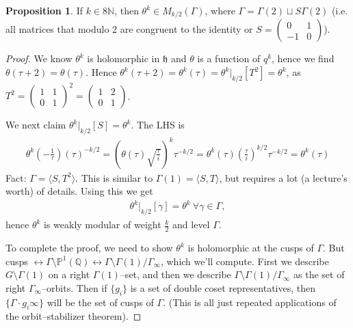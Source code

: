 \documentclass{article}
\theoremstyle{definition}
\newtheorem{prop}[theorem]{Proposition}
\begin{document}
\begin{prop}
    If $k \in 8 \mathbb{N}$, then $\theta^k \in M_{k/2}(\Gamma)$, where $\Gamma = \Gamma(2) \sqcup S \Gamma(2)$ (i.e. all matrices that modulo 2 are congruent to the identity or $S = \begin{pmatrix} 0&1\\-1&0 \end{pmatrix}$).
\end{prop}
\begin{proof}
    We know $\theta^k$ is holomorphic in $\mathfrak{h}$ and $\theta$ is a function of $q^k$, hence we find $\theta(\tau+2) = \theta(\tau)$. Hence $\theta^k(\tau+2) = \theta^k(\tau) = \theta^k|_{k/2}[T^2]=\theta^k$, as $T^2 = \begin{pmatrix} 1 & 1\\0 &1 \end{pmatrix}^2 = \begin{pmatrix} 1 & 2\\0 & 1 \end{pmatrix}$.
    \vspace{1mm}
     
    We next claim $\theta^k|_{k/2}[S] = \theta^k$. The LHS is 
    \begin{align*}
        \theta^k \left(-\frac{1}{\tau}\right)(\tau)^{-k/2} = \left(\theta(\tau) \sqrt{\frac{\tau}{i}}\right)^k \tau^{-k/2} = \theta^k(\tau)\left(\frac{\tau}{i}\right)^{k/2} \tau^{-k/2} = \theta^k(\tau)
    \end{align*}
    Fact: $\Gamma = \langle S, T^2 \rangle$. This is similar to $\Gamma(1) =\langle S, T \rangle$, but requires a lot (a lecture's worth) of details. Using this we get \begin{align*}
        \theta^k|_{k/2}[\gamma] = \theta^k ~\forall \gamma \in \Gamma,
    \end{align*}
    hence $\theta^k$ is weakly modular of weight $\frac{k}{2}$ and level $\Gamma$.


    To complete the proof, we need to show $\theta^k$ is holomorphic at the cusps of $\Gamma$. But cusps $\leftrightarrow \Gamma\setminus \mathbb{P}^1(\mathbb{Q}) \leftrightarrow \Gamma\setminus \Gamma(1) / \Gamma_{\infty}$, which we'll compute. First we describe $G \setminus \Gamma(1)$ on a right $\Gamma(1)$--set, and then we describe $\Gamma\setminus \Gamma(1) / \Gamma_{\infty}$ as the set of right $\Gamma_{\infty}$--orbits. Then if $\{g_i\}$ is a set of double coset representatives, then $\{\Gamma\cdot g_i \infty\}$ will be the set of cusps of $\Gamma$. (This is all just repeated applications of the orbit--stabilizer theorem).
    \vspace{1mm}
     

\end{proof}
\end{document}
